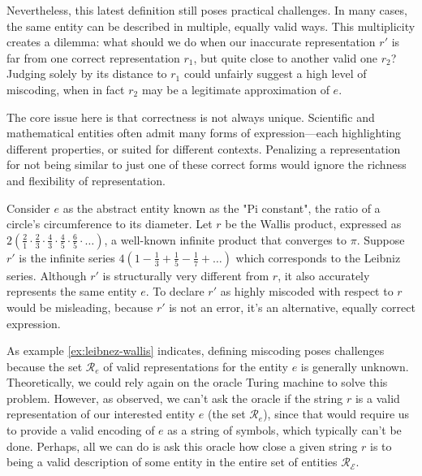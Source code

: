 Nevertheless, this latest definition still poses practical challenges. In many cases, the same entity can be described in multiple, equally valid ways. This multiplicity creates a dilemma: what should we do when our inaccurate representation $r'$ is far from one correct representation $r_1$, but quite close to another valid one $r_2$? Judging  solely by its distance to $r_1$ could unfairly suggest a high level of miscoding, when in fact $r_2$ may be a legitimate approximation of $e$.

The core issue here is that correctness is not always unique. Scientific and mathematical entities often admit many forms of expression—each highlighting different properties, or suited for different contexts. Penalizing a representation for not being similar to just one of these correct forms would ignore the richness and flexibility of representation.

\begin{example}
\label{ex:leibnez-wallis}
Consider $e$ as the abstract entity known as the "Pi constant", the ratio of a circle's circumference to its diameter. Let $r$ be the Wallis product, expressed as $2 (\frac{2}{1} \cdot \frac{2}{3} \cdot \frac{4}{3} \cdot \frac{4}{5} \cdot \frac{6}{5} \cdot \ldots)$, a well-known infinite product that converges to $\pi$. Suppose $r'$ is the infinite series $4 (1 - \frac{1}{3} + \frac{1}{5} - \frac{1}{7} + \ldots)$ which corresponds to the Leibniz series. Although $r'$ is structurally very different from $r$, it also accurately represents the same entity $e$. To declare $r'$ as highly miscoded with respect to $r$ would be misleading, because $r'$ is not an error, it's an alternative, equally correct expression.
\end{example}

As example \ref{ex:leibnez-wallis} indicates, defining miscoding poses challenges because the set $\mathcal{R}_e$ of valid representations for the entity $e$ is generally unknown. Theoretically, we could rely again on the oracle Turing machine to solve this problem. However, as observed, we can't ask the oracle if the string $r$ is a valid representation of our interested entity $e$ (the set $\mathcal{R}_e$), since that would require us to provide a valid encoding of $e$ as a string of symbols, which typically can't be done. Perhaps, all we can do is ask this oracle how close a given string $r$ is to being a valid description of some entity in the entire set of entities $\mathcal{R}_\mathcal{E}$.

